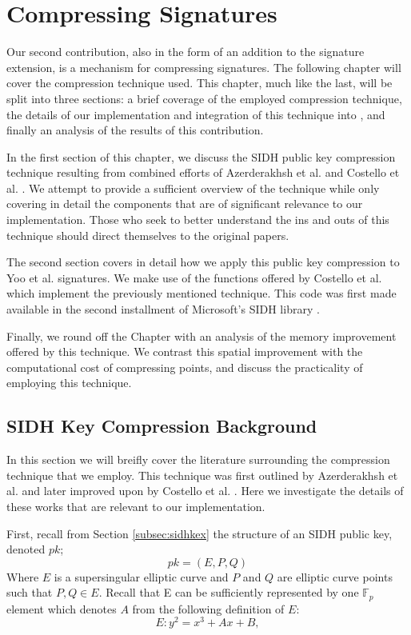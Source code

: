 \chapter{Compressing Signatures}
\label{sec:compress}

Our second contribution, also in the form of an addition to the \sidh signature extension, is a mechanism for compressing signatures. The following chapter will cover the compression technique used. This chapter, much like the last, will be split into three sections: a brief coverage of the employed compression technique, the details of our implementation and integration of this technique into \sidh, and finally an analysis of the results of this contribution.

In the first section of this chapter, we discuss the SIDH public key compression technique resulting from combined efforts of Azerderakhsh et al. \cite{compwr} and Costello et al. \cite{pkcomp}. We attempt to provide a sufficient overview of the technique while only covering in detail the components that are of significant relevance to our implementation. Those who seek to better understand the ins and outs of this technique should direct themselves to the original papers.  

The second section covers in detail how we apply this public key compression to Yoo et al. signatures. We make use of the functions offered by Costello et al. which implement the previously mentioned technique. This code was first made available in the second installment of Microsoft's SIDH library \cite{sidhcode}.

Finally, we round off the Chapter with an analysis of the memory improvement offered by this technique. We contrast this spatial improvement with the computational cost of compressing points, and discuss the practicality of employing this technique. 

\section{SIDH Key Compression Background}

In this section we will breifly cover the literature surrounding the compression technique that we employ. This technique was first outlined by Azerderakhsh et al. \cite{compwr} and later improved upon by Costello et al. \cite{pkcomp}. Here we investigate the details of these works that are relevant to our implementation.

First, recall from Section \ref{subsec:sidhkex} the structure of an SIDH public key, denoted $pk$;
$$
pk = (E, P, Q)
$$
Where $E$ is a supersingular elliptic curve and $P$ and $Q$ are elliptic curve points such that $P, Q \in E$. Recall that E can be sufficiently represented by one $\mathbb{F}_{p}$ element which denotes $A$ from the following definition of $E$:
$$
E : y^2 = x^3 + Ax + B,
$$

